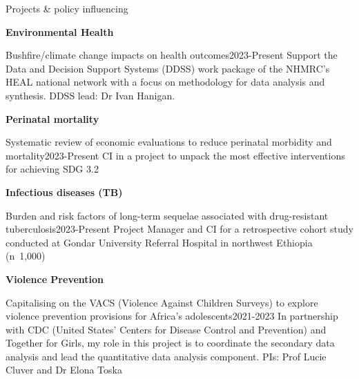\begin{rSection}{Projects \& policy influencing}

\begin{etaremune}

\vspace{1em}
\item \textbf{Environmental Health}\par

\begin{rSubsection}
{Bushfire/climate change impacts on health outcomes}{2023-Present}
{Support the Data and Decision Support Systems (DDSS) work package of the NHMRC’s HEAL national network with a focus on methodology for data analysis and synthesis. DDSS lead: Dr Ivan Hanigan.} \par
\end{rSubsection}

\vspace{1em}
\item \textbf{Perinatal mortality}\par

\begin{rSubsection}
{Systematic review of economic evaluations to reduce perinatal morbidity and mortality}{2023-Present}
{CI in a project to unpack the most effective interventions for achieving SDG 3.2} \par
\end{rSubsection}

\vspace{1em}
\item \textbf{Infectious diseases (TB)}\par

\begin{rSubsection}
{Burden and risk factors of long-term sequelae associated with drug-resistant tuberculosis}{2023-Present}
{Project Manager and CI for a retrospective cohort study conducted at Gondar University Referral Hospital in northwest Ethiopia (n~1,000)} \par
\end{rSubsection}

\vspace{1em}
\item \textbf{Violence Prevention}\par

\begin{rSubsection}
{Capitalising on the VACS (Violence Against Children Surveys) to explore violence prevention provisions for Africa’s adolescents}{2021-2023}
{In partnership with CDC (United States' Centers for Disease Control and Prevention) and Together for Girls, my role in this project is to coordinate the secondary data analysis and lead the quantitative data analysis component. PIs: Prof Lucie Cluver and Dr Elona Toska} \par
\end{rSubsection}


\end{etaremune}
\end{rSection}
